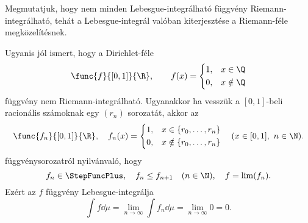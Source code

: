 \documentclass[
]{elteikthesis}[2024/04/26]
\begin{document}
	\begin{notes}

		\item
		Megmutatjuk, hogy nem minden Lebesgue-integrálható függvény Riemann-integrálható, 
		tehát a Lebesgue-integrál valóban kiterjesztése a Riemann-féle megközelítésnek.
		
		Ugyanis jól ismert, hogy a Dirichlet-féle
		\[
			\func{f}{[0, 1]}{\R}, \qquad
			f(x) =
			\left\{
			\begin{aligned}
				1, & \quad x \in \Q \\
				0, & \quad x \notin \Q
			\end{aligned}
			\right.
		\]
		függvény nem Riemann-integrálható. 
		Ugyanakkor ha vesszük a \( [0, 1] \)-beli racionális számoknak egy 
		\( (r_n) \) sorozatát, akkor az
		\[
			\func{f_n}{[0, 1]}{\R}, \quad
			f_n(x) =
			\left\{
			\begin{aligned}
				1, & \quad x \in \{ r_0, \dots, r_n \} \\
				0, & \quad x \notin \{ r_0, \dots, r_n \}
			\end{aligned}
			\right.
			\quad (x \in [0, 1], \ n \in \N).
		\]
		függvénysorozatról nyilvánvaló, hogy
		\[
			f_n \in \StepFuncPlus, \quad
			f_n \leq f_{n + 1} \quad (n \in \N), \quad
			f = \lim(f_n).
		\]
		Ezért az \( f \) függvény Lebesgue-integrálja
		\[
			\int f \dd{\mu} =
			\lim_{n \to \infty} \int f_n \dd{\mu} = 
			\lim_{n \to \infty} 0 = 
			0.
		\]
	\end{notes}
	
\end{document}
